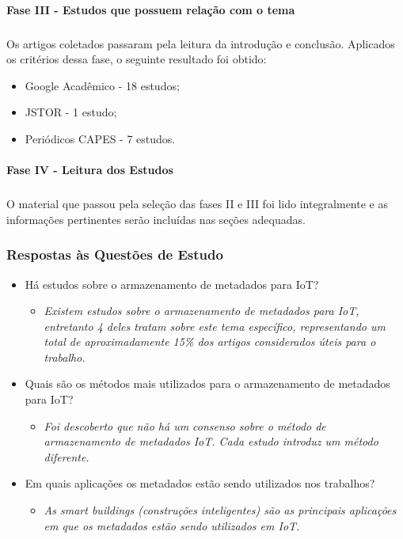 \paragraph{Fase III - Estudos que possuem relação com o tema}
\subparagraph{}
\quad Os artigos coletados passaram pela leitura da introdução e conclusão.
Aplicados os critérios dessa fase, o seguinte resultado foi obtido:
\begin{itemize}
  \item Google Acadêmico - 18 estudos;
  \item JSTOR - 1 estudo;
  \item Periódicos CAPES - 7 estudos.
\end{itemize}
\paragraph{Fase IV - Leitura dos Estudos}
\subparagraph{}
\quad O material que passou pela seleção das fases II e III foi lido integralmente e as
informações pertinentes serão incluídas nas seções adequadas.
\subsubsection{Respostas às Questões de Estudo}
\begin{itemize}
  \item Há estudos sobre o armazenamento de metadados para \acrlong{IoT}?
 \begin{itemize}
    \item \textit{Existem estudos sobre o armazenamento de metadados para \acrshort{IoT}, entretanto 4 deles tratam
    sobre este tema específico, representando um total de aproximadamente 15\% dos artigos considerados úteis para o trabalho.}
  \end{itemize}
  \item Quais são os métodos mais utilizados para o armazenamento de metadados para \acrshort{IoT}?
    \begin{itemize}
    \item \textit{Foi descoberto que não há um consenso sobre o método de armazenamento de metadados \acrshort{IoT}. Cada estudo introduz um método diferente.}
  \end{itemize}
  \item Em quais aplicações os metadados estão sendo utilizados nos trabalhos?
  \begin{itemize}
    \item \textit{As smart buildings (construções inteligentes) são as principais aplicações em que os metadados estão sendo utilizados em \acrshort{IoT}.}
  \end{itemize}
\end{itemize}

